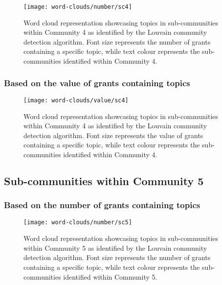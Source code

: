 \begin{figure}[htbp]
    \centering
    \texttt{[image: word-clouds/number/sc4]}
    \caption[Word cloud representation based on the number of grants containing topics in sub-communities within Community 4]{Word cloud representation showcasing topics in sub-communities within Community 4 as identified by the Louvain community detection algorithm. Font size represents the number of grants containing a specific topic, while text colour represents the sub-communities identified within Community 4.}
    \label{fig:topic_grant_number_sc4}
\end{figure}

\clearpage

\subsubsection{Based on the value of grants containing topics}

\begin{figure}[htbp]
    \centering
    \texttt{[image: word-clouds/value/sc4]}
    \caption[Word cloud representation based on the value of grants containing topics in sub-communities within Community 4]{Word cloud representation showcasing topics in sub-communities within Community 4 as identified by the Louvain community detection algorithm. Font size represents the value of grants containing a specific topic, while text colour represents the sub-communities identified within Community 4.}
    \label{fig:topic_grant_value_sc4}
\end{figure}

\subsection{Sub-communities within Community 5}

\subsubsection{Based on the number of grants containing topics}

\begin{figure}[htbp]
    \centering
    \texttt{[image: word-clouds/number/sc5]}
    \caption[Word cloud representation based on the number of grants containing topics in sub-communities within Community 5]{Word cloud representation showcasing topics in sub-communities within Community 5 as identified by the Louvain community detection algorithm. Font size represents the number of grants containing a specific topic, while text colour represents the sub-communities identified within Community 5.}
    \label{fig:topic_grant_number_sc5}
\end{figure}

